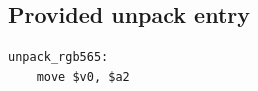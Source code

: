 \subsection{Provided unpack entry}
\begin{verbatim}
unpack_rgb565:
    move $v0, $a2
\end{verbatim}
